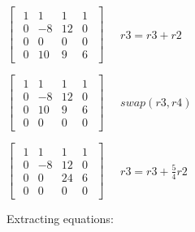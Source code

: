 \singlespacing

\begin{math}
    \begin{bmatrix}
        \begin{array}{ccc|c}
            1 & 1  & 1  & 1 \\
            0 & -8 & 12 & 0 \\
            0 & 0  & 0  & 0 \\
            0 & 10 & 9  & 6
        \end{array}
    \end{bmatrix}\quad
    \begin{array}{c}
        r3 = r3  + r2
    \end{array}
\end{math}

\singlespacing

\begin{math}
    \begin{bmatrix}
        \begin{array}{ccc|c}
            1 & 1  & 1  & 1 \\
            0 & -8 & 12 & 0 \\
            0 & 10 & 9  & 6 \\
            0 & 0  & 0  & 0
        \end{array}
    \end{bmatrix}\quad
    \begin{array}{c}
        swap(r3, r4)
    \end{array}
\end{math}

\singlespacing

\begin{math}
    \begin{bmatrix}
        \begin{array}{ccc|c}
            1 & 1  & 1  & 1 \\
            0 & -8 & 12 & 0 \\
            0 & 0  & 24 & 6 \\
            0 & 0  & 0  & 0
        \end{array}
    \end{bmatrix}\quad
    \begin{array}{c}
        r3 = r3 + \frac{5}{4}r2
    \end{array}
\end{math}

\singlespacing

Extracting equations:

